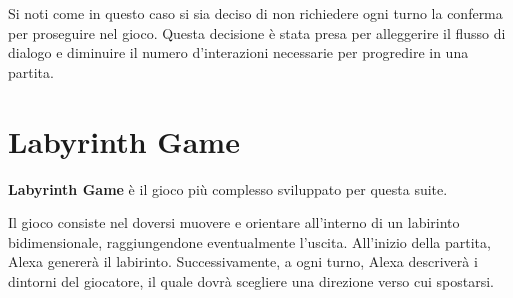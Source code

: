 Si noti come in questo caso si sia deciso di non richiedere ogni turno la
conferma per proseguire nel gioco. Questa decisione è stata presa per
alleggerire il flusso di dialogo e diminuire il numero d'interazioni necessarie
per progredire in una partita.

\section{Labyrinth Game}
\label{sec:Sezione4.3}

\textbf{Labyrinth Game} è il gioco più complesso sviluppato per questa suite.

Il gioco consiste nel doversi muovere e orientare all’interno di un labirinto
bidimensionale, raggiungendone eventualmente l’uscita. All’inizio della
partita, Alexa genererà il labirinto. Successivamente, a ogni turno, Alexa
descriverà i dintorni del giocatore, il quale dovrà scegliere una direzione
verso cui spostarsi.

